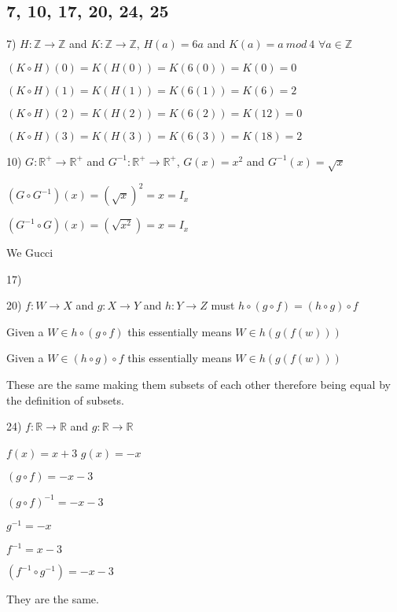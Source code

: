 \documentclass[11pt]{article}
\begin{document}
\subsection{7, 10, 17, 20, 24, 25}
\begin{flushleft}

7) $H:\mathbb{Z}\to \mathbb{Z}$ and $K:\mathbb{Z}\to \mathbb{Z}$, $H(a)=6a$ and $K(a)=a\ mod\ 4$ $\forall a \in \mathbb{Z}$

$(K\circ H)(0) = K(H(0)) = K(6(0)) = K(0) = 0$

$(K\circ H)(1) = K(H(1)) = K(6(1)) = K(6) = 2$

$(K\circ H)(2) = K(H(2)) = K(6(2)) = K(12) = 0$

$(K\circ H)(3) = K(H(3)) = K(6(3)) = K(18) = 2$

\hrulefill

10) $G: \mathbb{R}^+ \to \mathbb{R}^+$ and $G^{-1}: \mathbb{R}^+ \to \mathbb{R}^+$, $G(x) = x^2$ and $G^{-1}(x) = \sqrt{x}$ 

$(G\circ G^{-1})(x) = (\sqrt{x})^2 = x = I_x$ 

$(G^{-1}\circ G)(x) = (\sqrt{x^2}) = x = I_x$

We Gucci 

\hrulefill

17) 
\vspace{20mm}

\hrulefill

20) $f:W\to X$ and $g:X\to Y$ and $h:Y\to Z$ must $h\circ (g\circ f) = (h\circ g)\circ f$

Given a $W\in h\circ (g\circ f)$ this essentially means $W\in h(g(f(w)))$

Given a $W\in (h\circ g)\circ f$ this essentially means $W\in h(g(f(w)))$

These are the same making them subsets of each other therefore being equal by the definition of subsets.

\hrulefill

24) $f: \mathbb{R}\to \mathbb{R}$ and $g: \mathbb{R}\to \mathbb{R}$ 

$f(x)=x+3$ $g(x)=-x$

$(g\circ f)=-x-3$

$(g\circ f)^{-1} = -x-3$

$g^{-1} = -x$

$f^{-1} = x-3$

$ (f^{-1} \circ g^{-1}) = -x-3$

They are the same.

\hrulefill


\end{flushleft}
\end{document}
